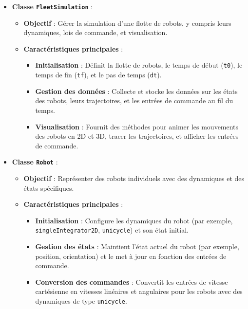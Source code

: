 \documentclass[a4paper,12pt]{article}
\begin{document}
\begin{itemize}
    \item \textbf{Classe \texttt{FleetSimulation}} :
    \begin{itemize}
        \item \textbf{Objectif} : Gérer la simulation d'une flotte de robots, y compris leurs dynamiques, lois de commande, et visualisation.
        \item \textbf{Caractéristiques principales} :
        \begin{itemize}
            \item \textbf{Initialisation} : Définit la flotte de robots, le temps de début (\texttt{t0}), le temps de fin (\texttt{tf}), et le pas de temps (\texttt{dt}).
            \item \textbf{Gestion des données} : Collecte et stocke les données sur les états des robots, leurs trajectoires, et les entrées de commande au fil du temps.
            \item \textbf{Visualisation} : Fournit des méthodes pour animer les mouvements des robots en 2D et 3D, tracer les trajectoires, et afficher les entrées de commande.
        \end{itemize}
    \end{itemize}

    \item \textbf{Classe \texttt{Robot}} :
    \begin{itemize}
        \item \textbf{Objectif} : Représenter des robots individuels avec des dynamiques et des états spécifiques.
        \item \textbf{Caractéristiques principales} :
        \begin{itemize}
            \item \textbf{Initialisation} : Configure les dynamiques du robot (par exemple, \texttt{singleIntegrator2D}, \texttt{unicycle}) et son état initial.
            \item \textbf{Gestion des états} : Maintient l'état actuel du robot (par exemple, position, orientation) et le met à jour en fonction des entrées de commande.
            \item \textbf{Conversion des commandes} : Convertit les entrées de vitesse cartésienne en vitesses linéaires et angulaires pour les robots avec des dynamiques de type \texttt{unicycle}.
        \end{itemize}
    \end{itemize}


\end{itemize}
\end{document}
